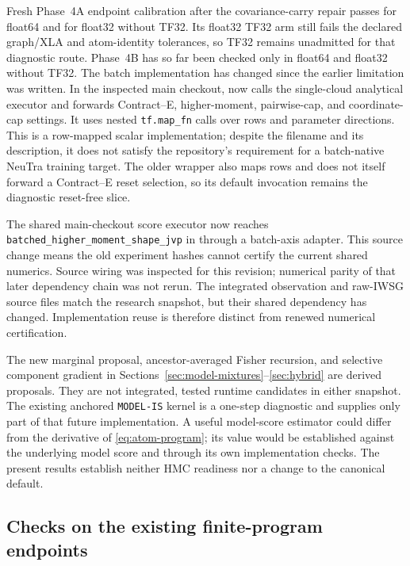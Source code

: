 \documentclass[11pt]{article}
\begin{document}
Fresh Phase~4A endpoint calibration after the covariance-carry repair passes
for float64 and for float32 without TF32.  Its float32 TF32 arm still fails the
declared graph/XLA and atom-identity tolerances, so TF32 remains unadmitted for
that diagnostic route.  Phase~4B has so far been checked only in float64 and
float32 without TF32.  The batch implementation has changed since the earlier limitation was
written. In the inspected main checkout,
 now calls the single-cloud analytical
executor and forwards Contract--E, higher-moment, pairwise-cap, and
coordinate-cap settings. It uses nested \texttt{tf.map\_fn} calls over rows
and parameter directions. This is a row-mapped scalar implementation; despite
the filename and its description, it does not satisfy the repository's
requirement for a batch-native NeuTra training target. The older
 wrapper also maps rows and does not itself
forward a Contract--E reset selection, so its default invocation remains the
diagnostic reset-free slice.

The shared main-checkout score executor now reaches
\texttt{batched\_higher\_moment\_shape\_jvp} in
 through a batch-axis adapter. This source
change means the old experiment hashes cannot certify the current shared
numerics. Source wiring was inspected for this revision; numerical parity of
that later dependency chain was not rerun. The integrated observation and
raw-IWSG source files match the research snapshot, but their shared dependency
has changed. Implementation reuse is therefore distinct from renewed
numerical certification.

The new marginal proposal, ancestor-averaged Fisher recursion, and selective
component gradient in Sections~\ref{sec:model-mixtures}--\ref{sec:hybrid}
are derived proposals. They are not integrated, tested runtime candidates in
either snapshot. The existing anchored \texttt{MODEL-IS} kernel is a
one-step diagnostic and supplies only part of that future implementation.
A useful model-score estimator could differ from the derivative of
\eqref{eq:atom-program}; its value would be established against the underlying
model score and through its own implementation checks. The present results
establish neither HMC readiness nor a change to the canonical default.

\subsection{Checks on the existing finite-program endpoints}
\end{document}
